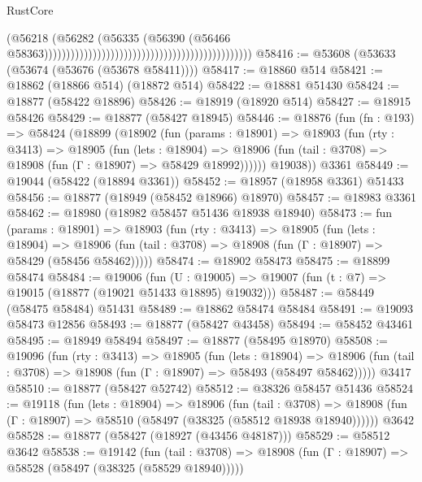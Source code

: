\begin{lexlean}{RustCore}
\begin{coremodule}
                                                                                        (@56218
                                                                                          (@56282
                                                                                            (@56335
                                                                                              (@56390
                                                                                                (@56466
                                                                                                  @58363)))))))))))))))))))))))))))))))))))))))))))))))
@58416 := @53608 (@53633 (@53674 (@53676 (@53678 @58411))))
@58417 := @18860 @514
@58421 := @18862 (@18866 @514) (@18872 @514)
@58422 := @18881 @51430
@58424 := @18877 (@58422 @18896)
@58426 := @18919 (@18920 @514)
@58427 := @18915 @58426
@58429 := @18877 (@58427 @18945)
@58446 := @18876
    (fun (fn : @193) =>
    @58424
      (@18899
        (@18902
          (fun (params : @18901) =>
          @18903
            (fun (rty : @3413) =>
            @18905
              (fun (lets : @18904) =>
              @18906 (fun (tail : @3708) => @18908 (fun (Γ : @18907) => @58429 @18992))))))
        @19038))
    @3361
@58449 := @19044 (@58422 (@18894 @3361))
@58452 := @18957 (@18958 @3361) @51433
@58456 := @18877 (@18949 (@58452 @18966) @18970)
@58457 := @18983 @3361
@58462 := @18980 (@18982 @58457 @51436 @18938 @18940)
@58473 := fun (params : @18901) =>
  @18903
    (fun (rty : @3413) =>
    @18905
      (fun (lets : @18904) =>
      @18906 (fun (tail : @3708) => @18908 (fun (Γ : @18907) => @58429 (@58456 @58462)))))
@58474 := @18902 @58473
@58475 := @18899 @58474
@58484 := @19006
    (fun (U : @19005) => @19007 (fun (t : @7) => @19015 (@18877 (@19021 @51433 @18895) @19032)))
@58487 := @58449 (@58475 @58484) @51431
@58489 := @18862 @58474 @58484
@58491 := @19093 @58473 @12856
@58493 := @18877 (@58427 @43458)
@58494 := @58452 @43461
@58495 := @18949 @58494
@58497 := @18877 (@58495 @18970)
@58508 := @19096
    (fun (rty : @3413) =>
    @18905
      (fun (lets : @18904) =>
      @18906 (fun (tail : @3708) => @18908 (fun (Γ : @18907) => @58493 (@58497 @58462)))))
    @3417
@58510 := @18877 (@58427 @52742)
@58512 := @38326 @58457 @51436
@58524 := @19118
    (fun (lets : @18904) =>
    @18906
      (fun (tail : @3708) =>
      @18908 (fun (Γ : @18907) => @58510 (@58497 (@38325 (@58512 @18938 @18940))))))
    @3642
@58528 := @18877 (@58427 (@18927 (@43456 @48187)))
@58529 := @58512 @3642
@58538 := @19142
    (fun (tail : @3708) => @18908 (fun (Γ : @18907) => @58528 (@58497 (@38325 (@58529 @18940)))))

\end{coremodule}
\end{lexlean}
